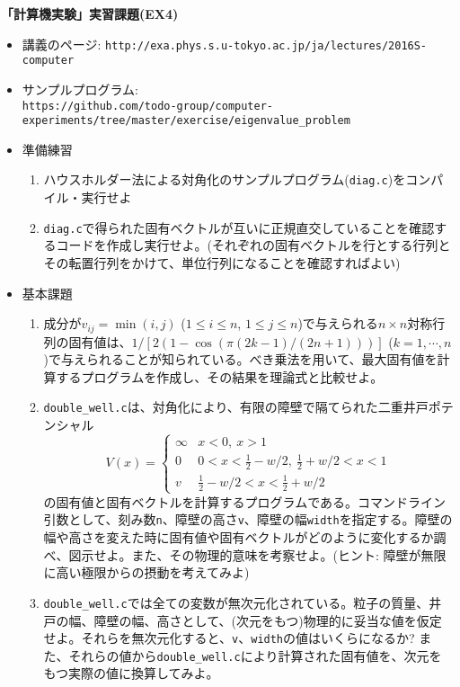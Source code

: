 \documentclass[11pt]{jarticle}
\begin{document}
\noindent
{\bf\large 「計算機実験」実習課題(EX4)}
\\[-0.5em]

\noindent
\begin{itemize}
\item 講義のページ: \verb+http://exa.phys.s.u-tokyo.ac.jp/ja/lectures/2016S-computer+

\item サンプルプログラム: \\ {\small \verb+https://github.com/todo-group/computer-experiments/tree/master/exercise/eigenvalue_problem+}
  
\item 準備練習
  \begin{enumerate}
  \item ハウスホルダー法による対角化のサンプルプログラム({\tt diag.c})をコンパイル・実行せよ
  \item {\tt diag.c}で得られた固有ベクトルが互いに正規直交していることを確認するコードを作成し実行せよ。(それぞれの固有ベクトルを行とする行列とその転置行列をかけて、単位行列になることを確認すればよい)
  \end{enumerate}

\item 基本課題
  \begin{enumerate}
  \item 成分が$v_{ij}=\min(i,j)$ ($1 \le i \le n$, $1 \le j \le n$)で与えられる$n \times n$対称行列の固有値は、$1/[2 (1 - \cos (\pi (2 k - 1) / (2 n + 1)))]$ ($k=1,\cdots,n$)で与えられることが知られている。べき乗法を用いて、最大固有値を計算するプログラムを作成し、その結果を理論式と比較せよ。
  \item {\tt double\_well.c}は、対角化により、有限の障壁で隔てられた二重井戸ポテンシャル
    \begin{equation*}
      V(x) = \begin{cases}
        \infty & x < 0, \ x > 1 \\
        0 & 0 < x < \frac{1}{2} - w/2, \ \frac{1}{2} + w/2 < x < 1 \\
        v & \frac{1}{2} - w/2 < x < \frac{1}{2} + w/2
      \end{cases}
    \end{equation*}
    の固有値と固有ベクトルを計算するプログラムである。コマンドライン引数として、刻み数{\tt n}、障壁の高さ{\tt v}、障壁の幅{\tt width}を指定する。障壁の幅や高さを変えた時に固有値や固有ベクトルがどのように変化するか調べ、図示せよ。また、その物理的意味を考察せよ。(ヒント: 障壁が無限に高い極限からの摂動を考えてみよ)
  \item {\tt double\_well.c}では全ての変数が無次元化されている。粒子の質量、井戸の幅、障壁の幅、高さとして、(次元をもつ)物理的に妥当な値を仮定せよ。それらを無次元化すると、{\tt v}、{\tt width}の値はいくらになるか? また、それらの値から{\tt double\_well.c}により計算された固有値を、次元をもつ実際の値に換算してみよ。
  \end{enumerate}
  

\end{itemize}
\end{document}
